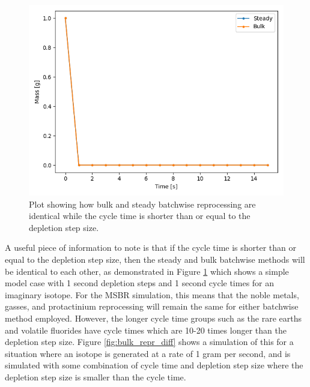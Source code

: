 
\begin{figure}[H]
  \centering
  \includegraphics[scale=0.45]{images/batch-steady-identical-compare.png}
  \caption{Plot showing how bulk and steady batchwise reprocessing are identical while the cycle time is shorter than or equal to the depletion step size.}
   \label{fig:bulk_repr_comp}
\end{figure}

A useful piece of information to note is that if the cycle time is shorter than or equal to the depletion step size, then the steady and bulk batchwise methods will be identical to each other, as demonstrated in Figure \ref{fig:bulk_repr_comp} which shows a simple model case with 1 second depletion steps and 1 second cycle times for an imaginary isotope. For the MSBR simulation, this means that the noble metals, gasses, and protactinium reprocessing will remain the same for either batchwise method employed. However, the longer cycle time groups such as the rare earths and volatile fluorides have cycle times which are 10-20 times longer than the depletion step size. Figure \ref{fig:bulk_repr_diff} shows a simulation of this for a situation where an isotope is generated at a rate of 1 gram per second, and is simulated with some combination of cycle time and depletion step size where the depletion step size is smaller than the cycle time.

